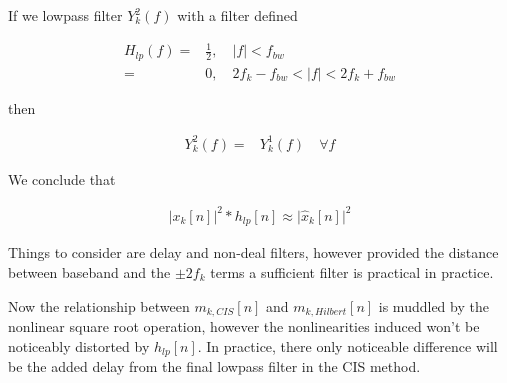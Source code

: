 \documentclass [11pt, proquest,oneside] {ganter_thesis}[2015/03/03]
\begin{document}
If we lowpass filter $Y_k^2(f)$ with a filter defined

\begin{align}
H_{lp}(f) =& \frac{1}{2}, \quad |f| < f_{bw} \\
=& 0, \quad 2f_k - f_{bw} < |f| < 2f_k + f_{bw}
\end{align}

then

\begin{align}
Y_{k}^2(f) =& Y_k^1(f) \quad \forall f
\end{align}

We conclude that 

\begin{align}
\label{eq:squared_cis_hilbert}
\Big| x_k[n] \Big|^2 * h_{lp}[n] \approx \Big| \widehat{x}_k[n] \Big|^2
\end{align}

Things to consider are delay and non-deal filters, however provided the distance between baseband and the $\pm2f_k$ terms a sufficient filter is practical in practice.

Now the relationship between $m_{k,CIS}[n]$ and $m_{k,Hilbert}[n]$ is muddled by the nonlinear square root operation, however the nonlinearities induced won't be noticeably distorted by $h_{lp}[n]$.  In practice, there only noticeable difference will be the added delay from the final lowpass filter in the CIS method.

\end{document}

